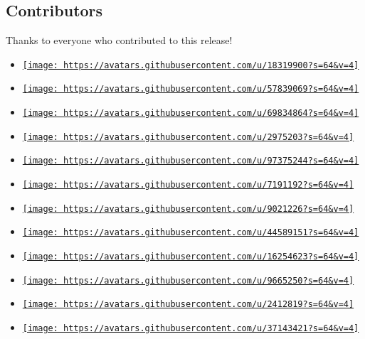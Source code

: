 \subsection{Contributors}\label{contributors}

Thanks to everyone who contributed to this release!

\begin{itemize}
\tightlist
\item
  \href{https://github.com/Leedehai}{\texttt{[image: https://avatars.githubusercontent.com/u/18319900?s=64\&v=4]}}
\item
  \href{https://github.com/MDLC01}{\texttt{[image: https://avatars.githubusercontent.com/u/57839069?s=64\&v=4]}}
\item
  \href{https://github.com/Coekjan}{\texttt{[image: https://avatars.githubusercontent.com/u/69834864?s=64\&v=4]}}
\item
  \href{https://github.com/bluebear94}{\texttt{[image: https://avatars.githubusercontent.com/u/2975203?s=64\&v=4]}}
\item
  \href{https://github.com/mkorje}{\texttt{[image: https://avatars.githubusercontent.com/u/97375244?s=64\&v=4]}}
\item
  \href{https://github.com/EpicEricEE}{\texttt{[image: https://avatars.githubusercontent.com/u/7191192?s=64\&v=4]}}
\item
  \href{https://github.com/PgBiel}{\texttt{[image: https://avatars.githubusercontent.com/u/9021226?s=64\&v=4]}}
\item
  \href{https://github.com/frozolotl}{\texttt{[image: https://avatars.githubusercontent.com/u/44589151?s=64\&v=4]}}
\item
  \href{https://github.com/elegaanz}{\texttt{[image: https://avatars.githubusercontent.com/u/16254623?s=64\&v=4]}}
\item
  \href{https://github.com/Dherse}{\texttt{[image: https://avatars.githubusercontent.com/u/9665250?s=64\&v=4]}}
\item
  \href{https://github.com/knuesel}{\texttt{[image: https://avatars.githubusercontent.com/u/2412819?s=64\&v=4]}}
\item
  \href{https://github.com/Andrew15-5}{\texttt{[image: https://avatars.githubusercontent.com/u/37143421?s=64\&v=4]}}

\end{itemize}
